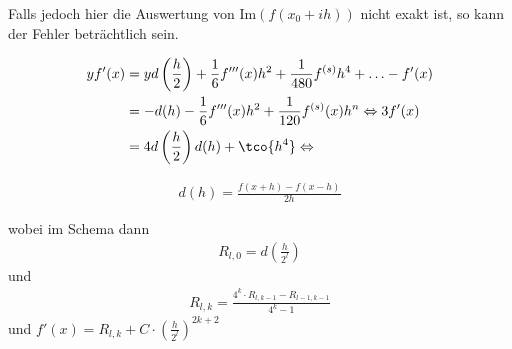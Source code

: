 Falls jedoch hier die Auswertung von $\text{Im}(f(x_0 + ih))$ nicht exakt ist, so kann der Fehler beträchtlich sein.


\setcounter{all}{20}
\begin{align*}
    y f'(x) & = y d\left(\frac{h}{2}\right) + \frac{1}{6} f'''(x) h^2 + \frac{1}{480}f^{(s)} h^4 + \ldots - f'(x) \\
            & = -d(h) - \frac{1}{6}f'''(x) h^2 + \frac{1}{120} f^{(s)}(x) h^n \Leftrightarrow 3 f'(x)             \\
            & = 4 d\left(\frac{h}{2}\right)  d(h) + \tco{h^4} \Leftrightarrow
\end{align*}



\begin{align*}
    d(h) = \frac{f(x + h) - f(x - h)}{2h}
\end{align*}

wobei im Schema dann
\begin{align*}
    R_{l, 0} = d\left( \frac{h}{2^l} \right)
\end{align*}
und
\begin{align*}
    R_{l, k} = \frac{4^k \cdot R_{l, k - 1} - R_{l - 1, k - 1}}{4^k - 1}
\end{align*}
und $f'(x) = R_{l, k} + C \cdot \left( \frac{h}{2^l} \right)^{2k + 2}$
